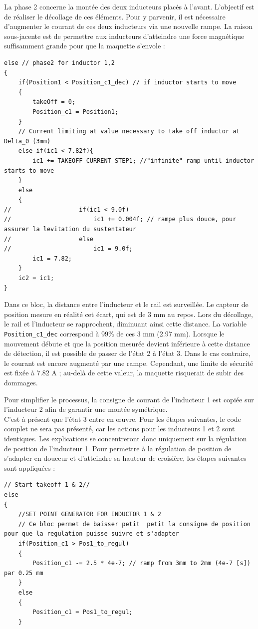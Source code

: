 La phase 2 concerne la montée des deux inducteurs placés à l'avant. L'objectif est de réaliser le décollage de ces éléments. Pour y parvenir, il est nécessaire d'augmenter le courant de ces deux inducteurs via une nouvelle rampe. La raison sous-jacente est de permettre aux inducteurs d'atteindre une force magnétique suffisamment grande pour que la maquette s'envole :

\begin{verbatim}
else // phase2 for inductor 1,2
{
    if(Position1 < Position_c1_dec) // if inductor starts to move
    {
        takeOff = 0;
        Position_c1 = Position1;
    }
    // Current limiting at value necessary to take off inductor at Delta_0 (3mm)
    else if(ic1 < 7.82f){
        ic1 += TAKEOFF_CURRENT_STEP1; //"infinite" ramp until inductor starts to move
    }
    else
    {
//                   if(ic1 < 9.0f)
//                       ic1 += 0.004f; // rampe plus douce, pour assurer la levitation du sustentateur
//                   else
//                       ic1 = 9.0f;
        ic1 = 7.82;
    }
    ic2 = ic1;
}
\end{verbatim}

Dans ce bloc, la distance entre l'inducteur et le rail est surveillée. Le capteur de position mesure en réalité cet écart, qui est de 3 mm au repos. Lors du décollage, le rail et l'inducteur se rapprochent, diminuant ainsi cette distance. La variable \texttt{Position\_c1\_dec} correspond à 99\% de ces 3 mm (2.97 mm). Lorsque le mouvement débute et que la position mesurée devient inférieure à cette distance de détection, il est possible de passer de l'état 2 à l'état 3. Dans le cas contraire, le courant est encore augmenté par une rampe. Cependant, une limite de sécurité est fixée à 7.82 A ; au-delà de cette valeur, la maquette risquerait de subir des dommages.

Pour simplifier le processus, la consigne de courant de l'inducteur 1 est copiée sur l'inducteur 2 afin de garantir une montée symétrique.\\

C'est à présent que l'état 3 entre en œuvre. Pour les étapes suivantes, le code complet ne sera pas présenté, car les actions pour les inducteurs 1 et 2 sont identiques. Les explications se concentreront donc uniquement sur la régulation de position de l'inducteur 1.
Pour permettre à la régulation de position de s'adapter en douceur et d'atteindre sa hauteur de croisière, les étapes suivantes sont appliquées :

\begin{verbatim}
// Start takeoff 1 & 2//
else
{
    //SET POINT GENERATOR FOR INDUCTOR 1 & 2
    // Ce bloc permet de baisser petit  petit la consigne de position pour que la regulation puisse suivre et s'adapter
    if(Position_c1 > Pos1_to_regul)
    {
        Position_c1 -= 2.5 * 4e-7; // ramp from 3mm to 2mm (4e-7 [s]) par 0.25 mm
    }
    else
    {
        Position_c1 = Pos1_to_regul;
    }
\end{verbatim}

